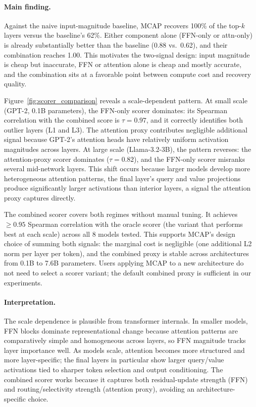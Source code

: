 \documentclass{article}
\begin{document}
\paragraph{Main finding.} Against the naive input-magnitude baseline, MCAP
recovers 100\% of the top-$k$ layers versus the baseline's 62\%. Either
component alone (FFN-only or attn-only) is already substantially better than
the baseline (0.88 vs.\ 0.62), and their combination reaches 1.00. This
motivates the two-signal design: input magnitude is cheap but inaccurate, FFN
or attention alone is cheap and mostly accurate, and the combination sits at a
favorable point between compute cost and recovery quality.

Figure~\ref{fig:scorer_comparison} reveals a scale-dependent pattern. At small scale (GPT-2,
0.1B parameters), the FFN-only scorer dominates: its Spearman correlation with the combined
score is $\tau = 0.97$, and it correctly identifies both outlier layers (L1 and L3). The
attention proxy contributes negligible additional signal because GPT-2's attention heads have
relatively uniform activation magnitudes across layers. At large scale (Llama-3.2-3B), the
pattern reverses: the attention-proxy scorer dominates ($\tau = 0.82$), and the FFN-only
scorer misranks several mid-network layers. This shift occurs because larger models develop
more heterogeneous attention patterns, the final layer's query and value projections produce
significantly larger activations than interior layers, a signal the attention proxy captures
directly.

The combined scorer covers both regimes without manual tuning. It achieves
$\geq 0.95$ Spearman correlation with the oracle scorer (the variant that
performs best at each scale) across all 8 models tested. This supports MCAP's
design choice of summing both signals: the marginal cost is negligible (one
additional L2 norm per layer per token), and the combined proxy is stable
across architectures from 0.1B to 7.6B parameters. Users applying MCAP to a
new architecture do not need to select a scorer variant; the default combined
proxy is sufficient in our experiments.

\paragraph{Interpretation.} The scale dependence is plausible from transformer internals.
In smaller models, FFN blocks dominate representational change because attention patterns are
comparatively simple and homogeneous across layers, so FFN magnitude tracks layer importance
well. As models scale, attention becomes more structured and more layer-specific; the final
layers in particular show larger query/value activations tied to sharper token selection and
output conditioning. The combined scorer works because it captures both residual-update
strength (FFN) and routing/selectivity strength (attention proxy), avoiding an architecture-
specific choice.
\end{document}
